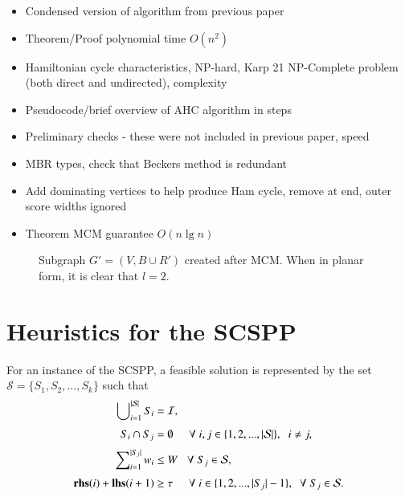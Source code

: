 \documentclass{elsarticle}
\begin{document}
\begin{itemize}
	\item Condensed version of algorithm from previous paper
	\item Theorem/Proof polynomial time $O(n^2)$
	\item Hamiltonian cycle characteristics, NP-hard, Karp 21 NP-Complete problem (both direct and undirected), complexity
	\item Pseudocode/brief overview of AHC algorithm in steps
	\item Preliminary checks - these were not included in previous paper, speed
	\item MBR types, check that Beckers method is redundant
	\item Add dominating vertices to help produce Ham cycle, remove at end, outer score widths ignored
	\item Theorem MCM guarantee $O(n \lg n)$
\end{itemize}

\begin{figure}[H]	
	\centering
	\begin{subfigure}[h]{0.4\textwidth}
		
	\end{subfigure} \quad
	\begin{subfigure}[h]{0.4\textwidth}
		
	\end{subfigure}
	\caption{Subgraph $G'= (V, B \cup R')$ created after MCM. When in planar form, it is clear that $l = 2$.}
	\label{fig:mps}
\end{figure}

\section{Heuristics for the SCSPP}

For an instance of the SCSPP, a feasible solution is represented by the set $\mathcal{S} = \{S_1, S_2, ..., S_k\}$ such that
\begin{subequations}
	\begin{align}
	\bigcup\nolimits_{i=1}^{|\mathcal{S}|} S_i &= \mathcal{I}, \label{eqn:packall}\\[3pt]
	S_i \cap S_j &= \emptyset \hspace{5mm} \forall \hspace{1mm} i, j \in \{1, 2, ..., |\mathcal{S}|\}, \hspace{2mm} i \neq j, \label{eqn:nooverlap} \\[3pt]
	\sum\nolimits_{i=1}^{|S_j|}w_i & \leq W \hspace{3mm} \forall \hspace{1mm} S_j \in \mathcal{S}, \label{eqn:capacity} \\[3pt]
	\textup{\textbf{rhs}}(i) + \textup{\textbf{lhs}}(i+1) &\geq \tau \hspace {5mm} \forall \hspace{1mm} i \in \{1, 2, ..., |S_j|-1\}, \hspace{2mm} \forall \hspace{1mm} S_j \in \mathcal{S}. \label{eqn:vscstrip}
	\end{align}
\end{subequations}
\end{document}

